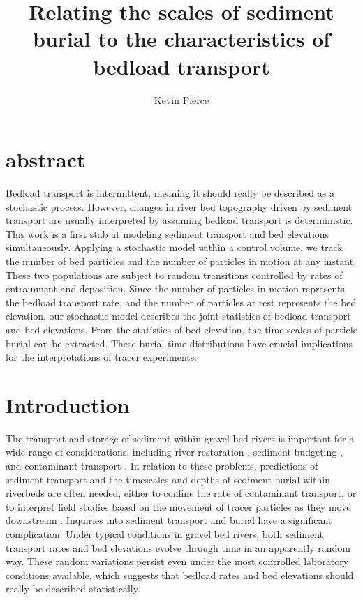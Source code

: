 \documentclass{article}
\begin{document}
\title{Relating the scales of sediment burial to the characteristics of bedload transport}
\author{Kevin Pierce}
\maketitle
\section{abstract}
Bedload transport is intermittent, meaning it should really be described as a stochastic process. 
However, changes in river bed topography driven by sediment transport are usually interpreted by assuming bedload transport is deterministic. 
This work is a first stab at modeling sediment transport and bed elevations simultaneously. 
Applying a stochastic model within a control volume, we track the number of bed particles and the number of particles in motion at any instant. 
These two populations are subject to random transitions controlled by rates of entrainment and deposition. 
Since the number of particles in motion represents the bedload transport rate, and the number of particles at rest represents the bed elevation, our stochastic model describes the joint statistics of bedload transport and bed elevations. 
From the statistics of bed elevation, the time-scales of particle burial can be extracted. 
These burial time distributions have crucial implications for the interpretations of tracer experiments. 

\section{Introduction}


The transport and storage of sediment within gravel bed rivers is important for a wide range of considerations, including river restoration \citep{Gaeuman2017}, sediment budgeting \citep{Malmon2003}, and contaminant transport \citep{Malmon2005}. In relation to these problems, predictions of sediment transport and the timescales and depths of sediment burial within riverbeds are often needed, either to confine the rate of contaminant transport, or to interpret field studies based on the movement of tracer particles as they move downstream \citep{Hassan2017, Bradley2017}. Inquiries into sediment transport and burial have a significant complication. Under typical conditions in gravel bed rivers, both sediment transport rates and bed elevations evolve through time in an apparently random way. These random variations persist even under the most controlled laboratory conditions available, which suggests that bedload rates and bed elevations should really be described statistically. 
\end{document}
